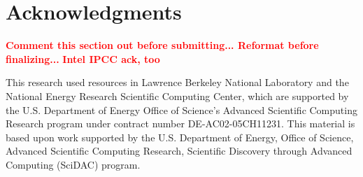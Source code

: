 \documentclass[conference]{IEEEtran}
\newcommand{\fix}[1]{{\bf \textcolor {red}{#1}}}
\begin{document}
\section*{Acknowledgments}
\fix{Comment this section out before submitting... Reformat before finalizing...}
\fix{Intel IPCC ack, too}

This research used resources in Lawrence Berkeley National Laboratory and the National Energy Research Scientific Computing Center, which are supported by the U.S. Department of Energy Office of Science's Advanced Scientific Computing Research program under contract number DE-AC02-05CH11231.  
This material is based upon work supported by the U.S. Department of Energy, Office of Science, Advanced Scientific Computing Research, Scientific Discovery through Advanced Computing (SciDAC) program.




\end{document}
